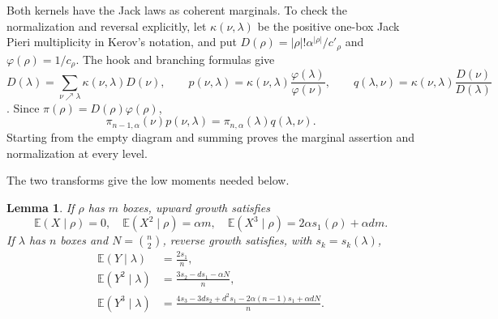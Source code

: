 \documentclass[11pt]{article}
\newtheorem{lemma}[theorem]{Lemma}
\newcommand{\E}{\mathbb E}
\begin{document}
Both kernels have the Jack laws as coherent marginals. To check the
normalization and reversal explicitly, let $\kappa(\nu,\lambda)$ be the
positive one-box Jack Pieri multiplicity in Kerov's notation, and put
$D(\rho)=|\rho|!\alpha^{|\rho|}/c'_\rho$ and $\varphi(\rho)=1/c_\rho$.
The hook and branching formulas give
\[
 D(\lambda)=\sum_{\nu\nearrow\lambda}\kappa(\nu,\lambda)D(\nu),\qquad
 p(\nu,\lambda)=\kappa(\nu,\lambda)\frac{\varphi(\lambda)}{\varphi(\nu)},
 \qquad q(\lambda,\nu)=\kappa(\nu,\lambda)\frac{D(\nu)}{D(\lambda)}
\]
\cite[Sections~6--7]{Kerov}. Since $\pi(\rho)=D(\rho)\varphi(\rho)$,
\begin{equation}\label{eq:balance}
 \pi_{n-1,\alpha}(\nu)p(\nu,\lambda)
       =\pi_{n,\alpha}(\lambda)q(\lambda,\nu).
\end{equation}
Starting from the empty diagram and summing proves the marginal assertion
and normalization at every level.

The two transforms give the low moments needed below.

\begin{lemma}\label{lem:moments}
If $\rho$ has $m$ boxes, upward growth satisfies
\begin{equation}\label{eq:upmoments}
 \E(X\mid\rho)=0,\quad \E(X^2\mid\rho)=\alpha m,\quad
 \E(X^3\mid\rho)=2\alpha s_1(\rho)+\alpha dm.
\end{equation}
If $\lambda$ has $n$ boxes and $N=\binom n2$, reverse growth satisfies,
with $s_k=s_k(\lambda)$,
\begin{align}
 \E(Y\mid\lambda)&=\frac{2s_1}{n},\label{eq:down1}\\
 \E(Y^2\mid\lambda)&=\frac{3s_2-ds_1-\alpha N}{n},\label{eq:down2}\\
 \E(Y^3\mid\lambda)&=
 \frac{4s_3-3ds_2+d^2s_1-2\alpha(n-1)s_1+\alpha dN}{n}.
 \label{eq:down3}
\end{align}
\end{lemma}
\end{document}
